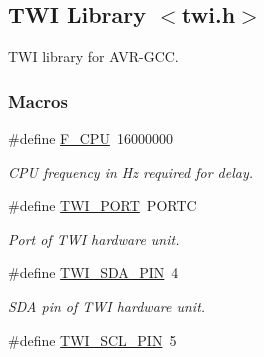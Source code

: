 \hypertarget{a00007}{}\subsection{T\+WI Library $<$twi.\+h$>$}
\label{a00007}


T\+WI library for A\+V\+R-\/\+G\+CC.  


\subsubsection*{Macros}
\begin{DoxyCompactItemize}
\item 
\#define \hyperlink{a00007_ga43bafb28b29491ec7f871319b5a3b2f8}{F\+\_\+\+C\+PU}~16000000\hypertarget{a00007_ga43bafb28b29491ec7f871319b5a3b2f8}{}\label{a00007_ga43bafb28b29491ec7f871319b5a3b2f8}

\begin{DoxyCompactList}\small\item\em C\+PU frequency in Hz required for delay. \end{DoxyCompactList}\item 
\#define \hyperlink{a00007_ga762c164f4acd04d3ce3627fe73e7c018}{T\+W\+I\+\_\+\+P\+O\+RT}~P\+O\+R\+TC\hypertarget{a00007_ga762c164f4acd04d3ce3627fe73e7c018}{}\label{a00007_ga762c164f4acd04d3ce3627fe73e7c018}

\begin{DoxyCompactList}\small\item\em Port of T\+WI hardware unit. \end{DoxyCompactList}\item 
\#define \hyperlink{a00007_ga3f14ed8491293d0dda1372cceaa39851}{T\+W\+I\+\_\+\+S\+D\+A\+\_\+\+P\+IN}~4\hypertarget{a00007_ga3f14ed8491293d0dda1372cceaa39851}{}\label{a00007_ga3f14ed8491293d0dda1372cceaa39851}

\begin{DoxyCompactList}\small\item\em S\+DA pin of T\+WI hardware unit. \end{DoxyCompactList}\item 
\#define \hyperlink{a00007_gac0ad8b33f1be48e211f1eeae2dd65cee}{T\+W\+I\+\_\+\+S\+C\+L\+\_\+\+P\+IN}~5\hypertarget{a00007_gac0ad8b33f1be48e211f1eeae2dd65cee}{}\label{a00007_gac0ad8b33f1be48e211f1eeae2dd65cee}


\end{DoxyCompactItemize}
